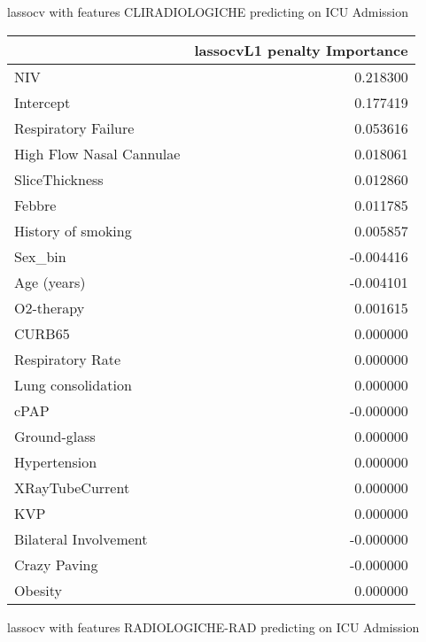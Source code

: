 {lassocv with features CLIRADIOLOGICHE predicting on ICU Admission

\begin{tabular}{lr}
\toprule
{} &  lassocvL1 penalty Importance \\
\midrule
NIV                      &                      0.218300 \\
Intercept                &                      0.177419 \\
Respiratory Failure      &                      0.053616 \\
High Flow Nasal Cannulae &                      0.018061 \\
SliceThickness           &                      0.012860 \\
Febbre                   &                      0.011785 \\
History of smoking       &                      0.005857 \\
Sex\_bin                  &                     -0.004416 \\
Age (years)              &                     -0.004101 \\
O2-therapy               &                      0.001615 \\
CURB65                   &                      0.000000 \\
Respiratory Rate         &                      0.000000 \\
Lung consolidation       &                      0.000000 \\
cPAP                     &                     -0.000000 \\
Ground-glass             &                      0.000000 \\
Hypertension             &                      0.000000 \\
XRayTubeCurrent          &                      0.000000 \\
KVP                      &                      0.000000 \\
Bilateral Involvement    &                     -0.000000 \\
Crazy Paving             &                     -0.000000 \\
Obesity                  &                      0.000000 \\
\bottomrule
\end{tabular}

lassocv with features RADIOLOGICHE-RAD predicting on ICU Admission

}
